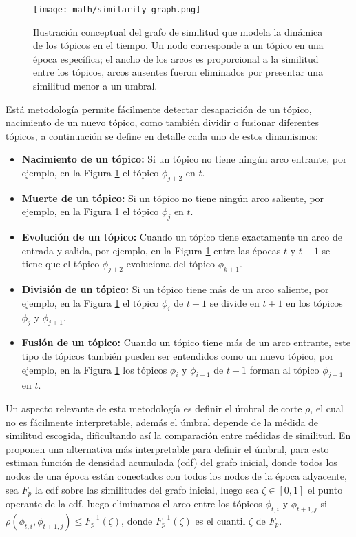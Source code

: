 \documentclass[letterpaper,12pt,oneside]{book} %
\begin{document}
\begin{figure}
    \centering
    \texttt{[image: math/similarity\_graph.png]}
    \caption{Ilustración conceptual del grafo de similitud que modela la dinámica de los tópicos en el tiempo. Un nodo corresponde a un tópico en una época específica; el ancho de los arcos es proporcional a la similitud entre los tópicos, arcos ausentes fueron eliminados por presentar una similitud menor a un umbral.}
    \label{img:graph}
\end{figure}

Está metodología permite fácilmente detectar desaparición de un tópico, nacimiento de un nuevo tópico, como también dividir o fusionar diferentes tópicos, a continuación se define en detalle cada uno de estos dinamismos:

\begin{itemize}
    \item \textbf{Nacimiento de un tópico:} Si un tópico no tiene ningún arco entrante, por ejemplo, en la Figura \ref{img:graph} el tópico $\phi_{j+2}$ en $t$.
    \item \textbf{Muerte de un tópico:} Si un tópico no tiene ningún arco saliente, por ejemplo, en la Figura \ref{img:graph} el tópico $\phi_{j}$ en $t$.
    \item \textbf{Evolución de un tópico:} Cuando un tópico tiene exactamente un arco de entrada y salida, por ejemplo, en la Figura \ref{img:graph} entre las épocas $t$ y $t+1$ se tiene que el tópico $\phi_{j+2}$ evoluciona del tópico $\phi_{k+1}$.
    \item \textbf{División de un tópico:} Si un tópico tiene más de un arco saliente, por ejemplo, en la Figura \ref{img:graph} el tópico $\phi_{i}$ de $t-1$ se divide en $t+1$ en los tópicos $\phi_{j}$ y $\phi_{j+1}$.
    \item \textbf{Fusión de un tópico:} Cuando un tópico tiene más de un arco entrante, este tipo de tópicos también pueden ser entendidos como un nuevo tópico, por ejemplo, en la Figura \ref{img:graph} los tópicos $\phi_{i}$ y $\phi_{i+1}$ de $t-1$ forman al tópico $\phi_{j+1}$ en $t$.
\end{itemize}

Un aspecto relevante de esta metodología es definir el úmbral de corte $\rho$, el cual no es fácilmente interpretable, además el úmbral depende de la médida de similitud escogida, dificultando así la comparación entre médidas de similitud. En \cite{beykikhoshk2018discovering} proponen una alternativa más interpretable para definir el úmbral, para esto estiman función de densidad acumulada (cdf) del grafo inicial, donde todos los nodos de una época están conectados con todos los nodos de la época adyacente, sea $F_{p}$ la cdf sobre las similitudes del grafo inicial, luego sea $\zeta \in [0,1]$ el punto operante de la cdf, luego eliminamos el arco entre los tópicos $\phi_{t,i}$ y $\phi_{t+1,j}$ si $\rho(\phi_{t,i}, \phi_{t+1,j})\leq F_{p}^{-1}(\zeta)$, donde  $F_{p}^{-1}(\zeta)$ es el cuantil $\zeta$ de $F_{p}$.
\end{document}
